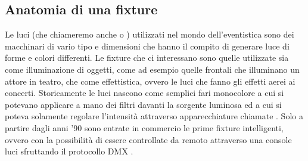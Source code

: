 \documentclass[main.tex]{subfiles}
\begin{document}
\subsection{Anatomia di una fixture}\label{subsec:1_fixtureAnatomy}
Le luci (che chiameremo anche  o ) utilizzati nel mondo dell'eventistica sono dei macchinari di vario tipo e dimensioni che hanno il compito di generare luce di forme e colori differenti. Le fixture che ci interessano sono quelle utilizzate sia come illuminazione di oggetti, come ad esempio quelle frontali che illuminano un attore in teatro, che come effettistica, ovvero le luci che fanno gli effetti aerei ai concerti. Storicamente le luci nascono come semplici fari monocolore a cui si potevano applicare a mano dei filtri davanti la sorgente luminosa ed a cui si poteva solamente regolare l'intensità attraverso apparecchiature chiamate . Solo a partire dagli anni '90 sono entrate in commercio le prime fixture intelligenti, ovvero con la possibilità di essere controllate da remoto attraverso una console luci sfruttando il protocollo DMX \cite{DMX}. 
\end{document}
